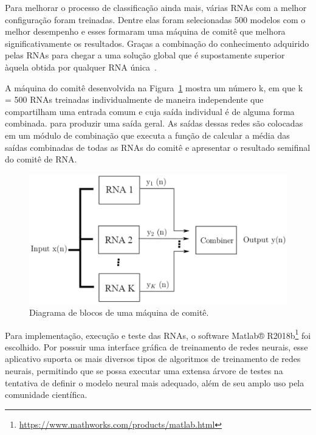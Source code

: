 Para melhorar o processo de classificação ainda mais, várias RNAs com a melhor configuração foram treinadas. Dentre elas foram selecionadas 500 modelos com o melhor desempenho e esses formaram uma máquina de comitê que melhora significativamente os resultados. Graças a combinação do conhecimento adquirido pelas RNAs para chegar a uma solução global que é supostamente superior àquela obtida por qualquer RNA única~\cite{haykin1994neural}. 

A máquina do comitê desenvolvida na Figura~\ref{fig:comite} mostra um número k, em que k = 500 RNAs treinadas individualmente de maneira independente que compartilham uma entrada comum e cuja saída individual é de alguma forma combinada. para produzir uma saída geral. As saídas dessas redes são colocadas em um módulo de combinação que executa a função de calcular a média das saídas combinadas de todas as RNAs do comitê e apresentar o resultado semifinal do comitê de RNA.

\begin{figure}[H]
\centering
\includegraphics[width=1\textwidth]{figuras/comite.eps}
\caption{Diagrama de blocos de uma máquina de comitê.}
\label{fig:comite}
\end{figure}

Para implementação, execução e teste das RNAs, o software Matlab® R2018b\footnote{\href{ https://www.mathworks.com/products/matlab.html} {https://www.mathworks.com/products/matlab.html}} foi escolhido. Por possuir uma interface gráfica de treinamento de redes neurais, esse aplicativo suporta os mais diversos tipos de algoritmos de treinamento de redes neurais, permitindo que se possa executar uma extensa árvore de testes na tentativa de definir o modelo neural mais adequado, além de seu amplo uso pela comunidade científica.